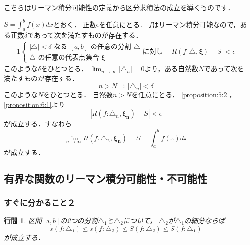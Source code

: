 \documentclass[uplatex]{jsarticle}
\makeatletter
\renewenvironment{proof}[1][\proofname]{\par
        \pushQED{\qed}
        \normalfont
        \topsep6\p@\@plus6\p@ \trivlist
        \item[\hskip\labelsep{\bfseries #1}\@addpunct{\bfseries}]\ignorespaces
    }{%
        \popQED\endtrivlist\@endpefalse
    }
\renewcommand{\proofname}{\underline{証明.}}
\newtheorem{proposition}{行間}
\makeatother
\begin{document}
こちらはリーマン積分可能性の定義から区分求積法の成立を導くものです．

\begin{proof}
    $S = \int_a^b f(x) dx$とおく．
    正数$\epsilon$を任意にとる．
    $f$はリーマン積分可能なので，ある正数$\delta$であって次を満たすものが存在する．
    \begin{alignat}{1}
        \begin{cases}
            |\triangle| < \delta \mbox{ なる } [a, b] \mbox{ の任意の分割 } \triangle \\
            \triangle \mbox{ の任意の代表点集合 } \mathbf{\xi}
        \end{cases}
        \mbox{に対し} \quad
        |R(f: \triangle, \mathbf{\xi}) - S| < \epsilon
        \label{proposition:6:1}
    \end{alignat}
    このような$\delta$をひとつとる．
    $\lim_{n\rightarrow\infty} |\triangle_n| = 0$より，ある自然数$N$であって次を満たすものが存在する．
    \begin{equation}
        n > N \Longrightarrow |\triangle_n| < \delta
        \label{proposition:6:2}
    \end{equation}
    このような$N$をひとつとる．
    自然数$n > N$を任意にとる．
    \cref{proposition:6:2}，\cref{proposition:6:1}より
    \begin{equation}
        |R(f: \triangle_n, \mathbf{\xi_n}) - S| < \epsilon
    \end{equation}
    が成立する．すなわち
    \begin{equation}
        \lim_{n\rightarrow\infty} R(f: \triangle_n, \mathbf{\xi_n})
        =
        S
        =
        \int_a^b f(x) dx
    \end{equation}
    が成立する．
\end{proof}

\setcounter{subsection}{3}
\subsection{有界な関数のリーマン積分可能性・不可能性}
\subsubsection{すぐに分かること２}
\begin{screen}
    \begin{proposition}
        区間$[a, b]$の2つの分割$\triangle_1$と$\triangle_2$について，
        $\triangle_2$が$\triangle_1$の細分ならば
        \begin{equation}
            s(f:\triangle_1) \leq s(f:\triangle_2) \leq S(f: \triangle_2) \leq S(f: \triangle_1)
            \label{proposition:7}
        \end{equation}
        が成立する．
    \end{proposition}
\end{screen}
\end{document}
